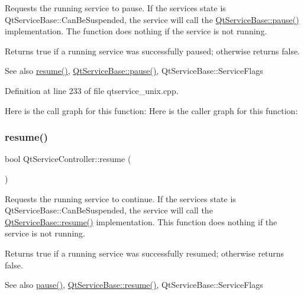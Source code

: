 Requests the running service to pause. If the service\textquotesingle{}s state is Qt\+Service\+Base\+::\+Can\+Be\+Suspended, the service will call the \mbox{\hyperlink{class_qt_service_base_a43215a7c5c047d30bcf4f697e6691f89}{Qt\+Service\+Base\+::pause()}} implementation. The function does nothing if the service is not running.

Returns true if a running service was successfully paused; otherwise returns false.

\begin{DoxySeeAlso}{See also}
\mbox{\hyperlink{class_qt_service_controller_a2d71eab6146427fc7b431386bf72eaec}{resume()}}, \mbox{\hyperlink{class_qt_service_base_a43215a7c5c047d30bcf4f697e6691f89}{Qt\+Service\+Base\+::pause()}}, Qt\+Service\+Base\+::\+Service\+Flags 
\end{DoxySeeAlso}


Definition at line 233 of file qtservice\+\_\+unix.\+cpp.

Here is the call graph for this function\+:
Here is the caller graph for this function\+:
\mbox{\label{class_qt_service_controller_a2d71eab6146427fc7b431386bf72eaec}} 
\subsubsection{\texorpdfstring{resume()}{resume()}}
{\footnotesize\ttfamily bool Qt\+Service\+Controller\+::resume (\begin{DoxyParamCaption}{ }\end{DoxyParamCaption})}

Requests the running service to continue. If the service\textquotesingle{}s state is Qt\+Service\+Base\+::\+Can\+Be\+Suspended, the service will call the \mbox{\hyperlink{class_qt_service_base_aaa2e05ef1c36283b6b35348c3972b489}{Qt\+Service\+Base\+::resume()}} implementation. This function does nothing if the service is not running.

Returns true if a running service was successfully resumed; otherwise returns false.

\begin{DoxySeeAlso}{See also}
\mbox{\hyperlink{class_qt_service_controller_aeee2fcc9469f77c7ed8a7955c4fa3a07}{pause()}}, \mbox{\hyperlink{class_qt_service_base_aaa2e05ef1c36283b6b35348c3972b489}{Qt\+Service\+Base\+::resume()}}, Qt\+Service\+Base\+::\+Service\+Flags 
\end{DoxySeeAlso}



